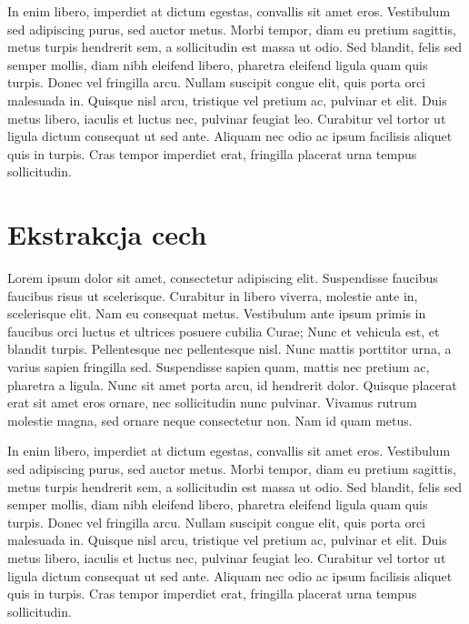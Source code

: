In enim libero, imperdiet at dictum egestas, convallis sit amet eros. Vestibulum sed adipiscing purus, sed auctor metus. Morbi tempor, diam eu pretium sagittis, metus turpis hendrerit sem, a sollicitudin est massa ut odio. Sed blandit, felis sed semper mollis, diam nibh eleifend libero, pharetra eleifend ligula quam quis turpis. Donec vel fringilla arcu. Nullam suscipit congue elit, quis porta orci malesuada in. Quisque nisl arcu, tristique vel pretium ac, pulvinar et elit. Duis metus libero, iaculis et luctus nec, pulvinar feugiat leo. Curabitur vel tortor ut ligula dictum consequat ut sed ante. Aliquam nec odio ac ipsum facilisis aliquet quis in turpis. Cras tempor imperdiet erat, fringilla placerat urna tempus sollicitudin.

\section{Ekstrakcja cech}

Lorem ipsum dolor sit amet, consectetur adipiscing elit. Suspendisse faucibus faucibus risus ut scelerisque. Curabitur in libero viverra, molestie ante in, scelerisque elit. Nam eu consequat metus. Vestibulum ante ipsum primis in faucibus orci luctus et ultrices posuere cubilia Curae; Nunc et vehicula est, et blandit turpis. Pellentesque nec pellentesque nisl. Nunc mattis porttitor urna, a varius sapien fringilla sed. Suspendisse sapien quam, mattis nec pretium ac, pharetra a ligula. Nunc sit amet porta arcu, id hendrerit dolor. Quisque placerat erat sit amet eros ornare, nec sollicitudin nunc pulvinar. Vivamus rutrum molestie magna, sed ornare neque consectetur non. Nam id quam metus.

In enim libero, imperdiet at dictum egestas, convallis sit amet eros. Vestibulum sed adipiscing purus, sed auctor metus. Morbi tempor, diam eu pretium sagittis, metus turpis hendrerit sem, a sollicitudin est massa ut odio. Sed blandit, felis sed semper mollis, diam nibh eleifend libero, pharetra eleifend ligula quam quis turpis. Donec vel fringilla arcu. Nullam suscipit congue elit, quis porta orci malesuada in. Quisque nisl arcu, tristique vel pretium ac, pulvinar et elit. Duis metus libero, iaculis et luctus nec, pulvinar feugiat leo. Curabitur vel tortor ut ligula dictum consequat ut sed ante. Aliquam nec odio ac ipsum facilisis aliquet quis in turpis. Cras tempor imperdiet erat, fringilla placerat urna tempus sollicitudin.

